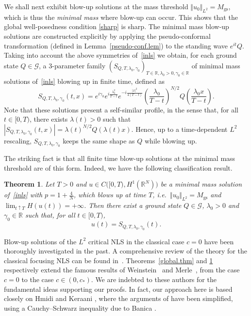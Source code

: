 \documentclass[reqno]{amsart}
\newcommand{\real}{\mathbb{R}}
\newcommand{\rn}{\real^N}
\newcommand{\R}{\mathbb{R}}
\newcommand{\lam}{\lambda}
\theoremstyle{plain}
\newtheorem{theorem}{Theorem}
\theoremstyle{definition}
\numberwithin{equation}{section}
\begin{document}
We shall next exhibit blow-up solutions at the mass threshold 
$\Vert u_0\Vert_{L^2}=M_\mathrm{gs}$, which is thus
the {\em minimal mass} where blow-up can occur. This shows that the global
well-posedness condition \eqref{sharp} is sharp.
The minimal mass blow-up solutions are constructed explicitly by applying the pseudo-conformal
transformation (defined in Lemma~\ref{pseudo-conf.lem}) to the standing wave $e^{it}Q$. 
Taking into account the above symmetries of~\eqref{inls} we obtain, for each
ground state $Q\in \mathcal{G}$, a 3-parameter
family $(S_{Q,T,\lambda_0,\gamma_0})_{T\in\R,\lambda_0>0,\gamma_0\in\R}$ of minimal 
mass solutions of~\eqref{inls} blowing up in finite time, defined as
\begin{equation} \label{S1.def}
S_{Q,T,\lambda_0,\gamma_0}(t,x) = e^{i\gamma_0} e^{i\frac{\lambda_0^2}{T-t}} e^{-i\frac{|x|^2}{4(T-t)}}
\left(\frac{\lambda_0}{T-t}\right)^{N/2}Q\left( \frac{\lambda_0x}{T-t} \right).
\end{equation}
Note that these solutions present a self-similar profile, in the sense that, for all $t\in [0,T)$, there
exists $\lam(t)>0$ such that $|S_{Q,T,\lambda_0,\gamma_0}(t,x)|=\lam(t)^{N/2}Q(\lam(t)x)$. Hence,
up to a time-dependent $L^2$ rescaling, $S_{Q,T,\lambda_0,\gamma_0}$ 
keeps the same shape as $Q$ while blowing up.


The striking fact is that all finite time blow-up solutions at the minimal mass threshold
are of this form. Indeed, we have the following classification result.

\begin{theorem} \label{main.thm}
Let $T>0$ and $u\in C\big([0,T),H^1(\rn)\big)$ be a minimal mass solution of~\eqref{inls}
with $p=1+\frac{4}{N}$, which blows up at time $T$, 
\emph{i.e.}~$\Vert u_0\Vert_{L^2}=M_\mathrm{gs}$ and $\lim_{t\uparrow T} H(u(t))=+\infty$.
Then there exist a ground state $Q\in \mathcal{G}$, $\lambda_0>0$ 
and $\gamma_0\in\R$ such that, for all $t\in [0,T)$,
\[
u(t)=S_{Q,T,\lambda_0,\gamma_0}(t).
\]
\end{theorem}

Blow-up solutions of the $L^2$ critical NLS in the classical case $c=0$ 
have been thoroughly investigated in the past.
A comprehensive review of the theory  
for the classical focusing NLS can be found in~\cite{r}.
Theorems~\ref{global.thm} and \ref{main.thm} respectively
extend the famous results of Weinstein~\cite{w82} and Merle~\cite{merle}, 
from the case $c=0$ to the case $c\in(0,c_*)$. We are indebted to these authors for the
fundamental ideas supporting our proofs. In fact, our approach here is based closely on 
Hmidi and Keraani \cite{keraani}, where the arguments of \cite{merle} have been simplified, 
using a Cauchy--Schwarz inequality due to Banica \cite{banica}.
\end{document}
